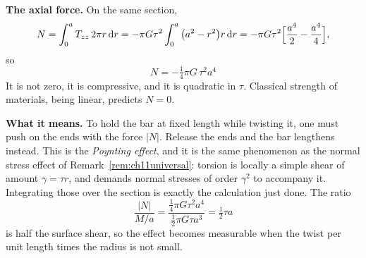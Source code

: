 \begin{solution}
\textbf{The axial force.} On the same section,
\[
   N=\int^{a}_{0}T_{zz}\,2\pi r\,\mathrm{d} r
   =-\pi G\tau^{2}\int^{a}_{0}\big(a^{2}-r^{2}\big)r\,\mathrm{d} r
   =-\pi G\tau^{2}\Big[\frac{a^{4}}{2}-\frac{a^{4}}{4}\Big],
\]
so
\[
   \boxed{\;N=-\tfrac14\pi G\,\tau^{2}a^{4}\;}
\]
It is not zero, it is compressive, and it is quadratic in $\tau$.
Classical strength of materials, being linear, predicts $N=0$.

\textbf{What it means.} To hold the bar at fixed length while twisting
it, one must push on the ends with the force $|N|$. Release the ends and
the bar lengthens instead. This is the \emph{Poynting effect}, and it is
the same phenomenon as the normal stress effect of
Remark~\ref{rem:ch11universal}: torsion is locally a simple shear of
amount $\gamma=\tau r$, and  demands normal stresses of order
$\gamma^{2}$ to accompany it. Integrating those over the section is
exactly the calculation just done. The ratio
\[
   \frac{|N|}{M/a}=\frac{\tfrac14\pi G\tau^{2}a^{4}}
   {\tfrac12\pi G\tau a^{3}}=\tfrac12\tau a
\]
is half the surface shear, so the effect becomes measurable when the
twist per unit length times the radius is not small.
\end{solution}

